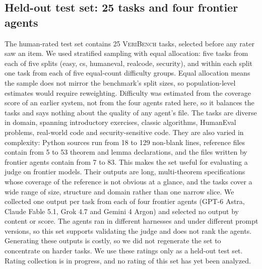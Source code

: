 \subsection{Held-out test set: 25 tasks and four frontier agents}
The human-rated test set contains 25 \textsc{VeriBench} tasks, selected before any rater saw an item.
We used stratified sampling with equal allocation: five tasks from each of five splits (easy, cs, humaneval, realcode, security), and within each split one task from each of five equal-count difficulty groups.
Equal allocation means the sample does not mirror the benchmark's split sizes, so population-level estimates would require reweighting.
Difficulty was estimated from the coverage score of an earlier system, not from the four agents rated here, so it balances the tasks and says nothing about the quality of any agent's file.
The tasks are diverse in domain, spanning introductory exercises, classic algorithms, HumanEval problems, real-world code and security-sensitive code.
They are also varied in complexity: Python sources run from 18 to 129 non-blank lines, reference files contain from 5 to 53 theorem and lemma declarations, and the files written by frontier agents contain from 7 to 83.
This makes the set useful for evaluating a judge on frontier models.
Their outputs are long, multi-theorem specifications whose coverage of the reference is not obvious at a glance, and the tasks cover a wide range of size, structure and domain rather than one narrow slice.
We collected one output per task from each of four frontier agents (GPT-6 Astra, Claude Fable 5.1, Grok 4.7 and Gemini 4 Argon) and selected no output by content or score.
The agents ran in different harnesses and under different prompt versions, so this set supports validating the judge and does not rank the agents.
Generating these outputs is costly, so we did not regenerate the set to concentrate on harder tasks.
We use these ratings only as a held-out test set.
Rating collection is in progress, and no rating of this set has yet been analyzed.


